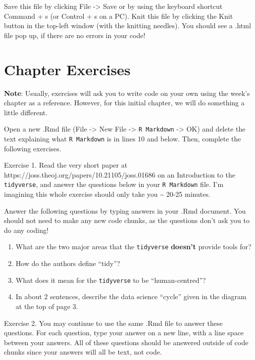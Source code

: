 \documentclass[
]{book}
\begin{document}
Save this file by clicking File -\textgreater{} Save or by using the keyboard shortcut Command + s (or Control + s on a PC). Knit this file by clicking the Knit button in the top-left window (with the knitting needles). You should see a .html file pop up, if there are no errors in your code!

\hypertarget{chapexercise-1}{%
\section{Chapter Exercises}\label{chapexercise-1}}

\textbf{Note}: Usually, exercises will ask you to write code on your own using the week's chapter as a reference. However, for this initial chapter, we will do something a little different.

Open a new .Rmd file (File -\textgreater{} New File -\textgreater{} \texttt{R\ Markdown} -\textgreater{} OK) and delete the text explaining what \texttt{R\ Markdown} is in lines 10 and below. Then, complete the following exercises.

Exercise 1. Read the very short paper at https://joss.theoj.org/papers/10.21105/joss.01686 on an Introduction to the \texttt{tidyverse}, and answer the questions below in your \texttt{R\ Markdown} file. I'm imagining this whole exercise should only take you \textasciitilde{} 20-25 minutes.

Answer the following questions by typing answers in your .Rmd document. You should not need to make any new code chunks, as the questions don't ask you to do any coding!

\begin{enumerate}
\def\labelenumi{\arabic{enumi}.}
\item
  What are the two major areas that the \texttt{tidyverse} \textbf{doesn't} provide tools for?
\item
  How do the authors define ``tidy''?
\item
  What does it mean for the \texttt{tidyverse} to be ``human-centred''?
\item
  In about 2 sentences, describe the data science ``cycle'' given in the diagram at the top of page 3.
\end{enumerate}

Exercise 2. You may continue to use the same .Rmd file to answer these questions. For each question, type your answer on a new line, with a line space between your answers. All of these questions should be answered outside of code chunks since your answers will all be text, not code.
\end{document}
